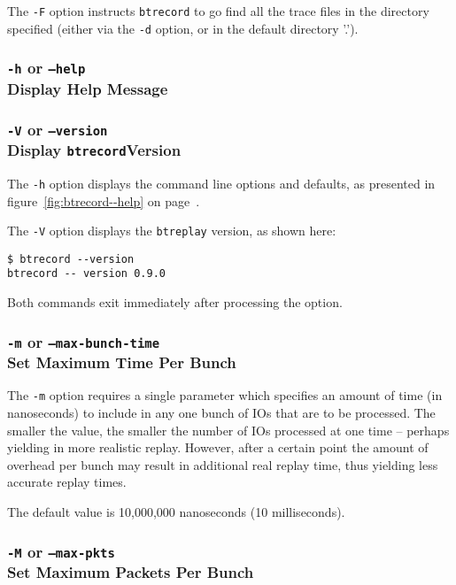 \documentclass{article}
\begin{document}
The \texttt{-F} option instructs \texttt{btrecord} to go find all the
trace files in the directory specified (either via the \texttt{-d}
option, or in the default directory '.').

\subsubsection{\texttt{-h} or \texttt{--help}\\Display Help Message}
\subsubsection{\texttt{-V} or \texttt{--version}\\Display
\texttt{btrecord}Version}

The \texttt{-h} option displays the command line options and
defaults, as presented in figure~\ref{fig:btrecord--help} on
page~\pageref{fig:btrecord--help}.

The \texttt{-V} option displays the \texttt{btreplay} version, as shown here:

\begin{verbatim}
$ btrecord --version
btrecord -- version 0.9.0
\end{verbatim}

Both commands exit immediately after processing the option.

\subsubsection{\label{sec:c-o-m}\texttt{-m} or
\texttt{--max-bunch-time}\\Set Maximum Time Per Bunch}

The \texttt{-m} option requires a single parameter which specifies an
amount of time (in nanoseconds) to include in any one bunch of IOs that
are to be processed. The smaller the value, the smaller the number of
IOs processed at one time -- perhaps yielding in more realistic replay.
However, after a certain point the amount of overhead per bunch may result
in additional real replay time, thus yielding less accurate replay times.

The default value is 10,000,000 nanoseconds (10 milliseconds).

\subsubsection{\label{sec:c-o-M}\texttt{-M} or
\texttt{--max-pkts}\\Set Maximum Packets Per Bunch}
\end{document}
